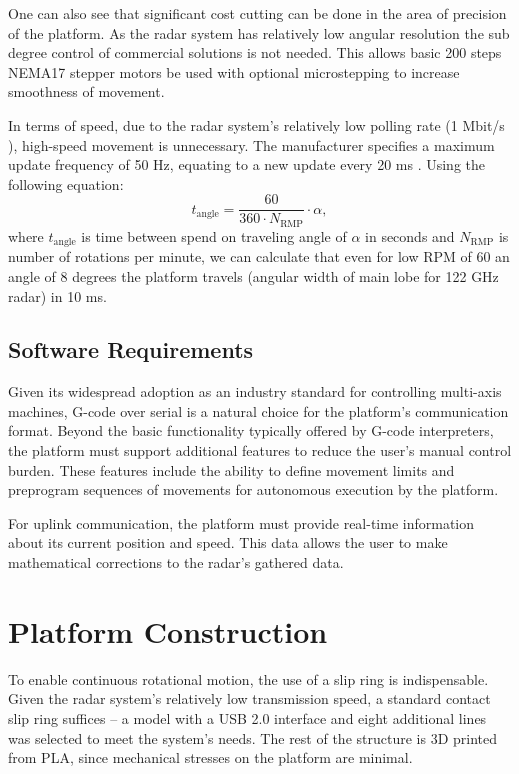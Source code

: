 One can also see that significant cost cutting can be done in the area of precision of the platform.
As the radar system has relatively low angular resolution the sub degree control of commercial solutions is not needed.
This allows basic 200 steps NEMA17 stepper motors be used with optional microstepping to increase smoothness of movement.


In terms of speed, due to the radar system's relatively low polling rate (1 Mbit/s \cite{sidarMAN}), high-speed movement is unnecessary. The manufacturer specifies a maximum update frequency of 50 Hz, equating to a new update every 20 ms \cite{sidarMAN}.
Using the following equation:
%
\begin{equation}
  t_{\mathrm{angle}} = \frac{60}{360\cdot N_{\mathrm{RMP}}} \cdot  \alpha,
  \label{eq:poll}
\end{equation}
%
where $t_{\mathrm{angle}}$ is time between spend on traveling angle of $\alpha $ in seconds and $N_{\mathrm{RMP}}$ is number of rotations per minute, we can calculate that even for low RPM of 60 an angle of 8 degrees the platform travels (angular width of main lobe for 122 GHz radar) in 10 ms.

\subsection{Software Requirements}

Given its widespread adoption as an industry standard for controlling multi-axis machines, G-code over serial is a natural choice for the platform's communication format. Beyond the basic functionality typically offered by G-code interpreters, the platform must support additional features to reduce the user's manual control burden. These features include the ability to define movement limits and preprogram sequences of movements for autonomous execution by the platform.

For uplink communication, the platform must provide real-time information about its current position and speed. This data allows the user to make mathematical corrections to the radar's gathered data.


\section{Platform Construction}


To enable continuous rotational motion, the use of a slip ring is indispensable. Given the radar system's relatively low transmission speed, a standard contact slip ring suffices -- a model with a USB 2.0 interface and eight additional lines was selected to meet the system's needs. The rest of the structure is 3D printed from PLA, since mechanical stresses on the platform are minimal.


